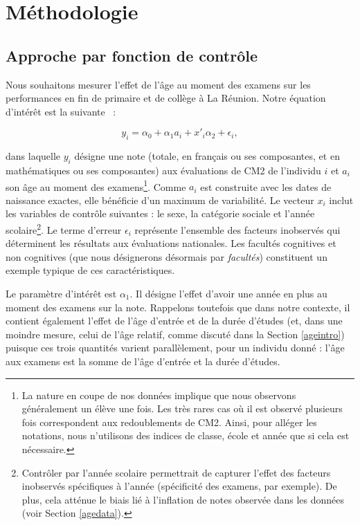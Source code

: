 \documentclass[
]{book}
\begin{document}
\newpage

\hypertarget{agemethods}{%
\section{Méthodologie}\label{agemethods}}

\hypertarget{agemethodscfh}{%
\subsection{Approche par fonction de contrôle}\label{agemethodscfh}}

Nous souhaitons mesurer l'effet de l'âge au moment des examens sur les performances en fin de primaire et de collège à La Réunion. Notre équation d'intérêt est la suivante ~:

\begin{equation}
\label{eq:ageols}
y_{i} = \alpha_0 + \alpha_1 a_{i} + x'_{i} \alpha_2 + \epsilon_{i},
\end{equation}

dans laquelle \(y_{i}\) désigne une note (totale, en français ou ses composantes, et en mathématiques ou ses composantes) aux évaluations de CM2 de l'individu \(i\) et \(a_i\) son âge au moment des examens\footnote{La nature en coupe de nos données implique que nous observons généralement un élève une fois. Les très rares cas où il est observé plusieurs fois correspondent aux redoublements de CM2. Ainsi, pour alléger les notations, nous n'utilisons des indices de classe, école et année que si cela est nécessaire.}. Comme \(a_i\) est construite avec les dates de naissance exactes, elle bénéficie d'un maximum de variabilité. Le vecteur \(x_{i}\) inclut les variables de contrôle suivantes : le sexe, la catégorie sociale et l'année scolaire\footnote{Contrôler par l'année scolaire permettrait de capturer l'effet des facteurs inobservés spécifiques à l'année (spécificité des examens, par exemple). De plus, cela atténue le biais lié à l'inflation de notes observée dans les données (voir Section \ref{agedata}).}. Le terme d'erreur \(\epsilon_{i}\) représente l'ensemble des facteurs inobservés qui déterminent les résultats aux évaluations nationales. Les facultés cognitives et non cognitives (que nous désignerons désormais par \emph{facultés}) constituent un exemple typique de ces caractéristiques.

\quad Le paramètre d'intérêt est \(\alpha_1\). Il désigne l'effet d'avoir une année en plus au moment des examens sur la note. Rappelons toutefois que dans notre contexte, il contient également l'effet de l'âge d'entrée et de la durée d'études (et, dans une moindre mesure, celui de l'âge relatif, comme discuté dans la Section \ref{ageintro}) puisque ces trois quantités varient parallèlement, pour un individu donné : l'âge aux examens est la somme de l'âge d'entrée et la durée d'études.
\end{document}
